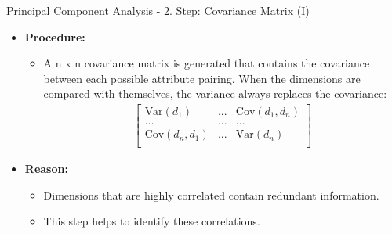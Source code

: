 \begin{frame}{Principal Component Analysis - 2. Step: Covariance Matrix (I)}
	\begin{itemize}
		\item \textbf{Procedure:}
		      \begin{itemize}
			      \item A n x n covariance matrix is generated that contains the
			            covariance between each possible attribute pairing. When the
			            dimensions are compared with themselves, the variance always
			            replaces the covariance:
			            \begin{align*}
				            \begin{bmatrix}
					            \text{Var}(d_1)      & ... & \text{Cov}(d_1, d_n) \\
					            ...                  & ... & ...                  \\
					            \text{Cov}(d_n, d_1) & ... & \text{Var}(d_n)      \\
				            \end{bmatrix}
			            \end{align*}
		      \end{itemize}
		\item \textbf{Reason:}
		      \begin{itemize}
			      \item Dimensions that are highly correlated contain redundant
			            information.
			      \item This step helps to identify these correlations.
		      \end{itemize}
	\end{itemize}
\end{frame}

